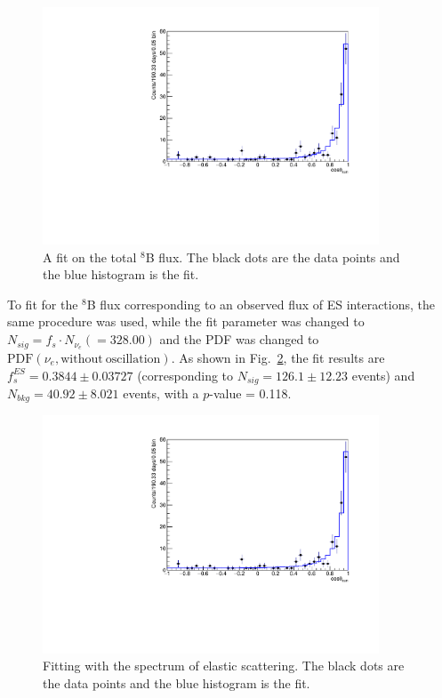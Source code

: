\begin{figure}[!htb]
	\centering
	\includegraphics[width=10cm]{TotalFluxFitMLP.pdf}
	\caption[A fit on the total $^8$B flux.]{A fit on the total $^8$B flux. The black dots are the data points and the blue histogram is the fit.\label{fig:TOTALfluxFit}}
\end{figure}

To fit for the $^8$B flux corresponding to an observed flux of ES interactions, the same procedure was used, while the fit parameter was changed to $N_{sig}=f_s\cdot N_{\nu_e}(=328.00)$ and the PDF was changed to $\mathrm{PDF}(\nu_e,\mathrm{without~oscillation})$. As shown in Fig.~\ref{fig:ESfluxFit}, the fit results are $f^{ES}_s=0.3844\pm 0.03727$ (corresponding to $N_{sig}=126.1\pm12.23$ events) and $N_{bkg}=40.92\pm 8.021$ events, with a $p$-value = 0.118.

\begin{figure}[!htb]
	\centering
	\includegraphics[width=10cm]{ESfluxFitMLP.pdf}
	\caption[Fitting with the spectrum of elastic scattering.]{Fitting with the spectrum of elastic scattering. The black dots are the data points and the blue histogram is the fit.\label{fig:ESfluxFit}}
\end{figure}

